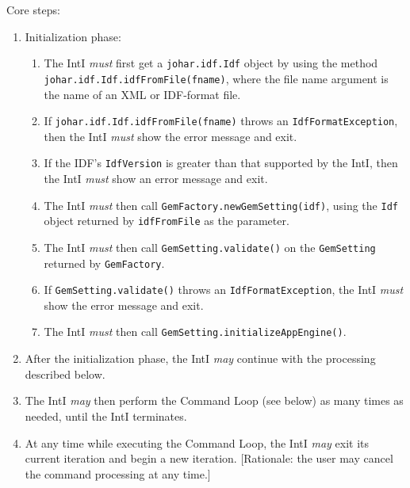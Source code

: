 \documentclass[11pt]{article}
\newcommand{\must}{{\it must}}
\newcommand{\may}{{\it may}}
\newcounter{coreReq}
\begin{document}
\noindent
Core steps:
\begin{enumerate}
\setcounter{enumi}{\value{coreReq}}
\item Initialization phase:
  \begin{enumerate}
  \item The IntI {\must} first get a {\tt johar.idf.Idf} object by using the
    method {\tt johar.idf.Idf.idfFromFile(fname)}, where the file name
    argument is the name of an XML or IDF-format file.
  \item If {\tt johar.idf.Idf.idfFromFile(fname)} throws an
    {\tt IdfFormatException}, then the IntI {\must} show the error message
    and exit.
  \item If the IDF's {\tt IdfVersion} is greater than that supported
    by the IntI, then the IntI {\must} show an error message
    and exit.
  \item The IntI {\must} then call {\tt GemFactory.newGemSetting(idf)},
    using the {\tt Idf} object returned by {\tt idfFromFile} as the
    parameter.
  \item The IntI {\must} then call {\tt GemSetting.validate()} on the
    {\tt GemSetting} returned by {\tt GemFactory}.
  \item If {\tt GemSetting.validate()} throws an
    {\tt IdfFormatException}, the IntI {\must} show the error message
    and exit.
  \item The IntI {\must} then call {\tt GemSetting.initializeAppEngine()}.
  \end{enumerate}
\item After the initialization phase, the IntI {\it may}
  continue with the processing described below.
\item The IntI {\may} then perform the Command Loop
  (see below) as many times as needed, until the IntI terminates.
\item At any time while executing the Command Loop, the IntI
  {\may} exit its current iteration and begin a new iteration.
  [Rationale: the user may cancel the command processing at any time.]
\setcounter{coreReq}{\value{enumi}}
\end{enumerate}
\end{document}
